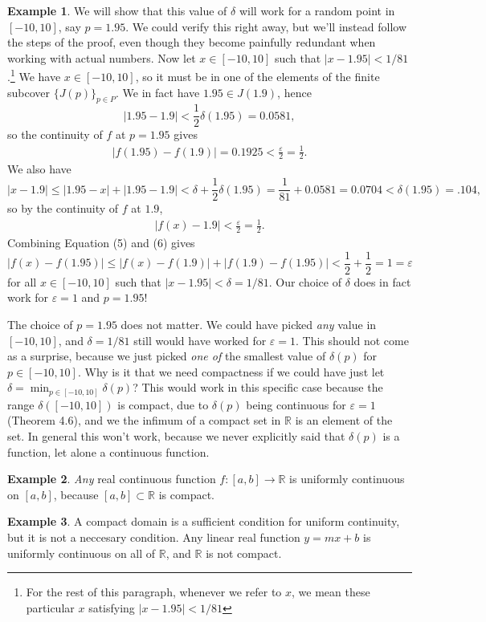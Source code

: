 \documentclass{article}
\newcommand{\R}{\mathbb{R}}
\theoremstyle{definition}
\newtheorem{example}{Example}[section]
\begin{document}
\begin{example}
		We will show that this value of $ \delta $ will work for a random point in $ [-10,10] $, say $ p=1.95 $. We could verify this right away, but we'll instead follow the steps of the proof, even though they become painfully redundant when working with actual numbers.  Now let $ x\in[-10,10] $ such that $ |x-1.95|<1/81 $.\footnote{For the rest of this paragraph, whenever we refer to $ x $, we mean these particular $ x $ satisfying  $ |x-1.95|<1/81 $} We have $ x\in[-10,10] $, so it must be in one of the elements of the finite subcover $ \{J(p)\}_{p\in P} $. We in fact have $ 1.95\in J(1.9) $, hence $$ |1.95-1.9|<\frac{1}{2}\delta(1.95)=0.0581 ,$$so the continuity of $ f $ at $ p=1.95 $ gives
		\begin{align}
			|f(1.95)-f(1.9)|=0.1925<\frac{\varepsilon}{2}=\frac{1}{2}.
		\end{align}
		We also have $$|x-1.9|\le|1.95-x|+|1.95-1.9|<\delta+\frac{1}{2}\delta(1.95)=\frac{1}{81}+0.0581=0.0704<\delta(1.95)=.104,  $$ so by the continuity of $ f $ at $ 1.9 $, 
		\begin{align}
			|f(x)-1.9|<\frac{\varepsilon}{2}=\frac{1}{2}.
		\end{align}
		Combining Equation (5) and (6)	gives $$|f(x)-f(1.95)|\le|f(x)-f(1.9)|+|f(1.9)-f(1.95)|<\frac{1}{2}+\frac{1}{2}=1=\varepsilon $$ for all $ x\in[-10,10] $ such that $ |x-1.95|<\delta=1/81 $. Our choice of $ \delta $ does in fact work for $ \varepsilon=1 $ and $ p=1.95 $! 
		
		The choice of $ p=1.95 $ does not matter. We could have picked \textit{any} value in $ [-10,10] $, and $ \delta=1/81 $ still would have worked for $ \varepsilon=1 $. This should not come as a surprise, because we just picked \textit{one of} the smallest value of $ \delta(p) $ for $ p\in[-10,10] $. Why is it that we need compactness if we could have just let $ \delta=\min_{p\in[-10,10]}\delta(p) $? This would work in this specific case because the range $ \delta([-10,10]) $ is compact, due to $ \delta(p) $ being continuous for $ \varepsilon=1 $ (Theorem 4.6), and we the infimum of a compact set in $ \R $ is an element of the set. In general this won't work, because we never explicitly said that $ \delta(p) $ is a function, let alone a continuous function.  
	\end{example}
	\begin{example}
		\textit{Any} real continuous function $ f:[a,b]\to\R $ is uniformly continuous on $ [a,b] $, because $ [a,b]\subset\R $ is compact. 
	\end{example}  
	\begin{example}
		A compact domain is a sufficient condition for uniform continuity, but it is not a neccesary condition. Any linear real function $ y=mx+b $ is uniformly continuous on all of $ \R $, and $ \R $ is not compact. 
	\end{example}
\end{document}
